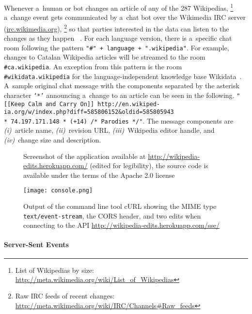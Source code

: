 \documentclass{sig-alternate}
\newcommand{\inlinelistingsize}{\fontsize{8pt}{11pt}}
\let\oldurl\url
\renewcommand{\url}[1]{\inlinelistingsize\oldurl{#1}}
\begin{document}
Whenever a~human or bot changes an article
of any of the 287 Wikipedias,%
\footnote{List of Wikipedias by size:
\url{http://meta.wikimedia.org/wiki/List_of_Wikipedias}}
a~change event gets communicated by a~chat bot
over the Wikimedia IRC server (\url{irc.wikimedia.org}),%
\footnote{Raw IRC feeds of recent changes:
\url{http://meta.wikimedia.org/wiki/IRC/Channels\#Raw_feeds}}
so that parties interested in the data
can listen to the changes as they happen%
~\cite{steiner2013mjnomore}.
For each language version, there is
a~specific chat room following the pattern
\texttt{"\#" + language + ".wikipedia"}.
For example, changes to Catalan Wikipedia articles
will be streamed to the room \texttt{\#ca.wikipedia}.
An exception from this pattern is the room
\texttt{\#wikidata.wikipedia} for the language-independent
knowledge base Wikidata~\cite{vrandecic2012wikidata}.
A~sample original chat message with the components separated
by the asterisk character \texttt{`*'}
announcing a~change to an article
can be seen in the following.
\texttt{"[[Keep Calm and Carry On]] http://en.wikiped-\\ ia.org/w/index.php?diff=585806152\&oldid=585805943 \\* 74.197.171.148 * (+14) /* Parodies */"}.
The message components are \emph{(i)}~article name, \emph{(ii)}~revision URL,
\emph{(iii)}~Wiki\-pedia editor handle, and
\emph{(iv)}~change size and description.

\begin{figure}[t!]
  \centering
  \caption{Screenshot of the application available at \url{http://wikipedia-edits.herokuapp.com/}
    (edited for legibility),
    the source code is available under the terms
    of the Apache 2.0 license}
  \label{fig:screenshot}
\end{figure}

\begin{figure}[t!]
  \centering
  \texttt{[image: console.png]}
  \caption{Output of the command line tool cURL
    showing the MIME type \texttt{text/event-stream}, the CORS header, and two edits when connecting to the API \url{http://wikipedia-edits.herokuapp.com/sse/}}
  \label{fig:console}
\end{figure}

\paragraph{Server-Sent Events}
\end{document}
